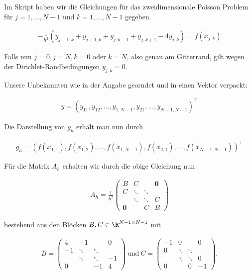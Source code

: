 \begin{solution}
  Im Skript haben wir die Gleichungen für das zweidimensionale Poisson Problem
  für $j = 1,\dots, N-1$ und $k = 1,\dots, N-1$ gegeben.

  \begin{align*}
    -\frac{1}{h^2}(y_{j-1,k} + y_{j+1,k}
    + y_{j,k-1} + y_{j,k+1}
    - 4 y_{j,k})
    =
    f(x_{j,k})
  \end{align*}

  Falls nun $j=0, j=N, k = 0$ oder $k=N$, also genau am Gitterrand,
  gilt wegen der Dirichlet-Randbedingungen $y_{j,k} = 0$.

  Unsere Unbekannten wie in der Angabe georndet und in einen Vektor verpackt:

  \begin{align*}
    y = (y_{11}, y_{12}, \dots, y_{1,N-1}, y_{21}, \dots, y_{N-1,N-1})^\top
  \end{align*}

  Die Darstellung von $g_h$ erhält man nun durch

  \begin{align*}
    g_h = (f(x_{1,1}), f(x_{1,2}), \dots, f(x_{1,N-1}), f(x_{2,1}), \dots, f(x_{N-1,N-1}))^\top
  \end{align*}

  Für die Matrix $A_h$ erhalten wir durch die obige Gleichung nun

  \begin{align*}
      A_h= \frac{1}{h^2}\left(\begin{array}{cccccc}
                  B & C && \boldsymbol{0} \\
                  C & \ddots & \ddots & \\
                  & \ddots & \ddots & C \\
                  \boldsymbol{0} && C & B
             \end{array}
       \right)
  \end{align*}

  bestehend aus den Blöcken $B,C \in \R^{N-1 \times N-1}$ mit

  \begin{align*}
      B = \left( \begin{array}{cccccc}
                  4 & -1 && 0 \\
                  -1 & \ddots & \ddots & \\
                  & \ddots & \ddots & -1 \\
                  0 && -1 & 4
           \end{array}
          \right)
  \mathrm{~und~}
      C = \left(\begin{array}{cccccc}
                  -1 & 0 && 0 \\
                  0 & \ddots & \ddots & \\
                  & \ddots & \ddots & 0 \\
                  0 && 0 & -1
            \end{array}
          \right).
   \end{align*}


\end{solution}
